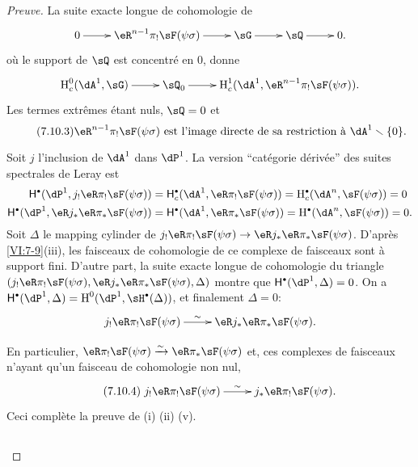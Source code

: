 \begin{proof}[Preuve]
La suite exacte longue de cohomologie de 
\[\xymatrix{
  0 \ar[r] 
    & \eR^{n-1} \pi_! \sF(\psi\sigma) \ar[r] 
    & \sG \ar[r] 
    & \sQ \ar[r] 
    & 0 \text{.} 
}\]
o\`u le support de $\sQ$ est concentr\'e en $0$, donne 
\[\xymatrix{
  \h_c^0(\dA^1,\sG) \ar[r] 
    & \sQ_0 \ar[r] 
    & \h_c^1(\dA^1,\eR^{n-1} \pi_! \sF(\psi\sigma)) \text{.} 
}\]
Les termes extr\^emes \'etant nuls, $\sQ=0$ et 
\begin{equation*}\tag{7.10.3}\label{VI:eq:7-10-3}
  \text{$\eR^{n-1} \pi_! \sF(\psi\sigma)$ est l'image directe de sa restriction \`a $\dA^1\setminus \{0\}$.}
\end{equation*}

Soit $j$ l'inclusion de $\dA^1$ dans $\dP^1$. La version ``cat\'egorie 
d\'eriv\'ee'' des suites spectrales de Leray est 
\begin{align*}
  \hh^\bullet(\dP^1,j_! \eR\pi_! \sF(\psi\sigma)) &= \hh_c^\bullet(\dA^1,\eR \pi_! \sF(\psi\sigma)) = \h_c^\bullet(\dA^n,\sF(\psi\sigma)) = 0 \\
  \hh^\bullet(\dP^1,\eR j_\ast \eR \pi_\ast \sF(\psi\sigma)) &= \hh^\bullet(\dA^1,\eR \pi_\ast \sF(\psi\sigma)) = \h^\bullet(\dA^n,\sF(\psi\sigma)) = 0 \text{.}
\end{align*}
Soit $\Delta$ le mapping cylinder de 
$j_! \eR\pi_! \sF(\psi\sigma) \to \eR j_\ast \eR \pi_\ast \sF(\psi\sigma)$. 
D'apr\`es \ref{VI:7-9}(iii), les faisceaux de cohomologie de ce complexe de 
faisceaux sont \`a support fini. D'autre part, la suite exacte longue de 
cohomologie du triangle 
$(j_!\eR \pi_! \sF(\psi\sigma),\eR j_\ast \eR \pi_\ast \sF(\psi\sigma),\Delta)$ 
montre que $\hh^\bullet(\dP^1,\Delta)=0$. On a 
$\hh^\bullet(\dP^1,\Delta) = \h^0(\dP^1,\sH^\bullet(\Delta))$, et finalement 
$\Delta=0$: 
\[\xymatrix{
  j_! \eR\pi_! \sF(\psi\sigma) \ar[r]^-\sim 
    & \eR j_\ast \eR \pi_\ast \sF(\psi\sigma) \text{.} 
}\]

En particulier, $\eR\pi_! \sF(\psi\sigma)\iso \eR\pi_\ast \sF(\psi\sigma)$ et, 
ces complexes de faisceaux n'ayant qu'un faisceau de cohomologie non nul, 
\begin{equation*}\tag{7.10.4}\label{VI:eq:7-10-4}
\xymatrix{
  j_! \eR \pi_! \sF(\psi\sigma) \ar[r]^-\sim 
    & j_\ast \eR \pi_! \sF(\psi\sigma) \text{.} 
}
\end{equation*}
Ceci compl\`ete la preuve de (i) (ii) (v). 





\subsection{}\label{VI:7-11}


\end{proof}
